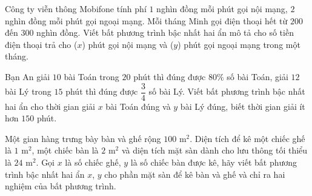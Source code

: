 \begin{bt}%
	Công ty viễn thông Mobifone tính phí $1$ nghìn đồng mỗi phút gọi nội mạng, $2$ nghìn đồng mỗi phút gọi ngoại mạng. Mỗi tháng Minh gọi điện thoại hết từ $200$ đến $300$ nghìn đồng. Viết bất phương trình bậc nhất hai ẩn mô tả cho số tiền điện thoại trả cho ($x$) phút gọi nội mạng và ($y$) phút gọi ngoại mạng trong một tháng.
\end{bt}

\begin{bt}%
	Bạn An giải $10$ bài Toán trong $20$ phút thì đúng được $80\%$ số bài Toán, giải $12$ bài Lý trong $15$ phút thì đúng được $\dfrac{3}{4}$ số bài Lý. Viết bất phương trình bậc nhất hai ẩn cho thời gian giải $x$ bài Toán đúng và $y$ bài Lý đúng, biết thời gian giải ít hơn $150$ phút.   
\end{bt}

\begin{bt}%
	Một gian hàng trưng bày bàn và ghế rộng $100$ m$^2$. Diện tích để kê một chiếc ghế là $1$ m$^2$, một chiếc bàn là $2$ m$^2$ và diện tích mặt sàn dành cho lưu thông tối thiểu là $24$ m$^2$. Gọi $x$ là số chiếc ghế, $y$ là số chiếc bàn được kê, hãy viết bất phương trình bậc nhất hai ẩn $x$, $y$ cho phần mặt sàn để kê bàn và ghế và chỉ ra hai nghiệm của bất phương trình.
\end{bt}

